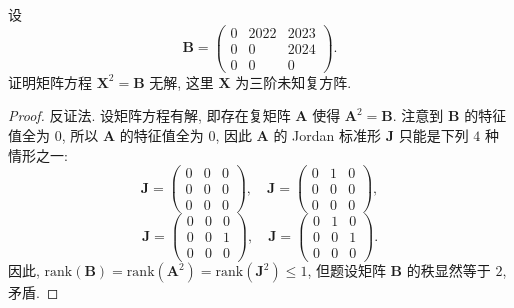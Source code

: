 \documentclass[../../main.tex]{subfiles}%
\begin{document}
\begin{example}
设
\[
\boldsymbol{B} = \begin{pmatrix} 0 & 2022 & 2023 \\ 0 & 0 & 2024 \\ 0 & 0 & 0 \end{pmatrix}.
\]
证明矩阵方程 \( \boldsymbol{X}^2 = \boldsymbol{B} \) 无解, 这里 \( \boldsymbol{X} \) 为三阶未知复方阵.
\end{example}
\begin{proof}

反证法. 设矩阵方程有解, 即存在复矩阵 \( \boldsymbol{A} \) 使得 \( \boldsymbol{A}^2 = \boldsymbol{B} \). 注意到 \( \boldsymbol{B} \) 的特征值全为 \( 0 \), 所以 \( \boldsymbol{A} \) 的特征值全为 \( 0 \), 因此 \( \boldsymbol{A} \) 的 Jordan 标准形 \( \boldsymbol{J} \) 只能是下列 \( 4 \) 种情形之一:
\[
\boldsymbol{J} = \begin{pmatrix} 0 & 0 & 0 \\ 0 & 0 & 0 \\ 0 & 0 & 0 \end{pmatrix}, \quad \boldsymbol{J} = \begin{pmatrix} 0 & 1 & 0 \\ 0 & 0 & 0 \\ 0 & 0 & 0 \end{pmatrix},
\]
\[
\boldsymbol{J} = \begin{pmatrix} 0 & 0 & 0 \\ 0 & 0 & 1 \\ 0 & 0 & 0 \end{pmatrix}, \quad \boldsymbol{J} = \begin{pmatrix} 0 & 1 & 0 \\ 0 & 0 & 1 \\ 0 & 0 & 0 \end{pmatrix}.
\]
因此, \( \mathrm{rank}(\boldsymbol{B}) = \mathrm{rank}(\boldsymbol{A}^2) = \mathrm{rank}(\boldsymbol{J}^2) \leqslant 1 \), 但题设矩阵 \( \boldsymbol{B} \) 的秩显然等于 \( 2 \), 矛盾.

\end{proof}
\end{document}

